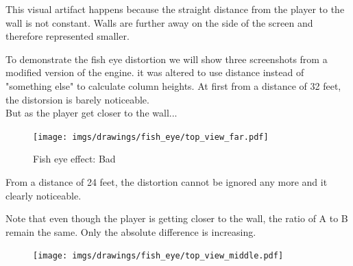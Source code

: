 \begin{minipage}{.4\textwidth}
This visual artifact happens because the straight distance from the player to the wall is not constant. Walls are further away on the side of the screen and therefore represented smaller.\\
\par
To demonstrate the fish eye distortion we will show three screenshots from a modified version of the engine. it was altered to use distance  instead of "something else" to calculate column heights. At first from a distance of 32 feet, the distorsion is barely noticeable.\\
But as the player get closer to the wall...
 \end{minipage}
\begin{minipage}{.6\textwidth}
\begin{figure}[H]
  \begin{flushright}
 \texttt{[image: imgs/drawings/fish\_eye/top\_view\_far.pdf]}
   \end{flushright}
\end{figure}
\end{minipage}

\par




\begin{figure}[H]
\centering
 \caption{Fish eye effect: Bad} \label{fig:mips}
 \end{figure}




\begin{minipage}{.4\textwidth}
From a distance of 24 feet, the distortion cannot be ignored any more and it clearly noticeable.\\
\par
Note that even though the player is getting closer to the wall, the ratio of A to B remain the same. Only the absolute difference is increasing.
 \end{minipage}
\begin{minipage}{.6\textwidth}
\begin{figure}[H]
  \begin{flushright}
 \texttt{[image: imgs/drawings/fish\_eye/top\_view\_middle.pdf]}
 \end{flushright}
\end{figure}
\end{minipage}






